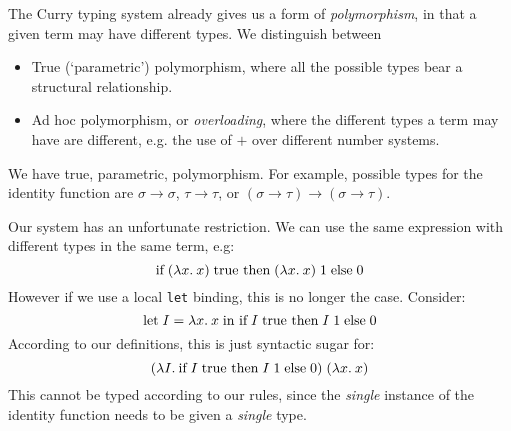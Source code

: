 \begin{slide*}


\vspace*{0.5cm}

The Curry typing system already gives us a form of {\em polymorphism}, in that
a given term may have different types. We distinguish between

\begin{itemize}

\item True (`parametric') polymorphism, where all the possible types bear a
structural relationship.

\item Ad hoc polymorphism, or {\em overloading}, where the different types a
term may have are different, e.g. the use of {\red $+$} over different number
systems.

\end{itemize}

We have true, parametric, polymorphism. For example, possible types for the
identity function are {\red $\sigma \to \sigma$}, {\red $\tau \to \tau$}, or
{\red $(\sigma \to \tau) \to (\sigma \to \tau)$}.

\end{slide*}



\begin{slide*}


\vspace*{0.5cm}

Our system has an unfortunate restriction. We can use the same expression with
different types in the same term, e.g:
{\red $$ \mbox{if}\; (\lambda x.\: x)\; \mbox{true then}\; (\lambda x.\: x)\; 1\;
\mbox{else}\; 0 $$}
However if we use a local {\tt let} binding, this is no longer the case.
Consider:
{\red $$ \mbox{let}\; I = \lambda x.\: x\; \mbox{in if}\; I\; \mbox{true then}\; I
\; 1\; \mbox{else}\; 0 $$}
\noindent According to our definitions, this is just syntactic sugar for:
{\red $$ (\lambda I.\: \mbox{if}\; I\; \mbox{true then}\; I \; 1\; \mbox{else}\;
0)\; (\lambda x.\: x) $$}
This cannot be typed according to our rules, since the {\em single} instance of
the identity function needs to be given a {\em single} type.

\end{slide*}



